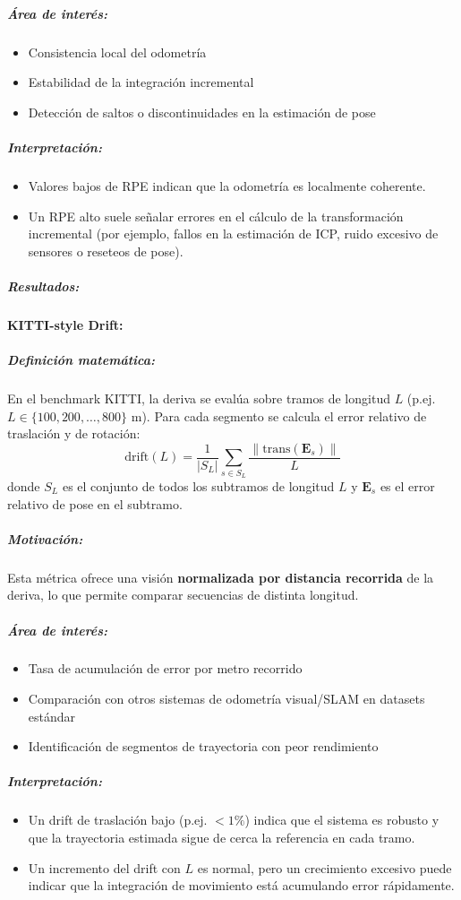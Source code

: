 \documentclass[12pt, a4paper, twoside]{article}
\begin{document}
\subparagraph{Área de interés:}
\begin{itemize}
  \item Consistencia local del odometría
  \item Estabilidad de la integración incremental
  \item Detección de saltos o discontinuidades en la estimación de pose
\end{itemize}

\subparagraph{Interpretación:}
\begin{itemize}
  \item Valores bajos de RPE indican que la odometría es localmente coherente.
  \item Un RPE alto suele señalar errores en el cálculo de la transformación incremental 
  (por ejemplo, fallos en la estimación de ICP, ruido excesivo de sensores o reseteos de pose).
\end{itemize}

\subparagraph{Resultados:}

\paragraph{KITTI-style Drift:}

\subparagraph{Definición matemática:}
En el benchmark KITTI, la deriva se evalúa sobre tramos de longitud $L$ (p.ej. $L \in \{100,200, \dots,800\}$ m).
Para cada segmento se calcula el error relativo de traslación y de rotación:
\[
\text{drift}(L) = 
\frac{1}{|S_L|} \sum_{s \in S_L}
\frac{\| \mathrm{trans}(\mathbf{E}_s)\|}{L}
\]
donde $S_L$ es el conjunto de todos los subtramos de longitud $L$ y 
$\mathbf{E}_s$ es el error relativo de pose en el subtramo.

\subparagraph{Motivación:}
Esta métrica ofrece una visión \textbf{normalizada por distancia recorrida} 
de la deriva, lo que permite comparar secuencias de distinta longitud.

\subparagraph{Área de interés:}
\begin{itemize}
  \item Tasa de acumulación de error por metro recorrido
  \item Comparación con otros sistemas de odometría visual/SLAM en datasets estándar
  \item Identificación de segmentos de trayectoria con peor rendimiento
\end{itemize}

\subparagraph{Interpretación:}
\begin{itemize}
  \item Un drift de traslación bajo (p.ej. $< 1\%$) indica que el sistema es robusto 
  y que la trayectoria estimada sigue de cerca la referencia en cada tramo.
  \item Un incremento del drift con $L$ es normal, pero un crecimiento excesivo 
  puede indicar que la integración de movimiento está acumulando error rápidamente.
\end{itemize}
\end{document}
